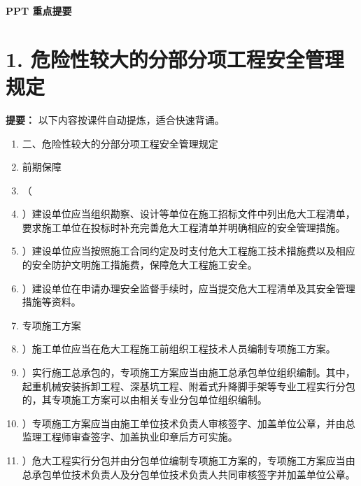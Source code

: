 \documentclass[UTF8,fontset=fandol,11pt]{ctexart}
\newcommand{\chaptertitle}[1]{\vspace{0.5em}\begin{tcolorbox}[enhanced,colback=deepblue,colframe=deepblue,arc=2mm,boxrule=0pt]\begin{center}\Large\bfseries\color{white}#1\end{center}\end{tcolorbox}\vspace{0.5em}}
\begin{document}
\tableofcontents

\newpage

\chaptertitle{PPT 重点提要}

\section*{1. 危险性较大的分部分项工程安全管理规定}


\begin{mainbox}

\textbf{提要：} 以下内容按课件自动提炼，适合快速背诵。

\end{mainbox}

\begin{enumerate}[label=\arabic*.]

\item 二、危险性较大的分部分项工程安全管理规定

\item 前期保障

\item （

\item ）建设单位应当组织勘察、设计等单位在施工招标文件中列出危大工程清单，要求施工单位在投标时补充完善危大工程清单并明确相应的安全管理措施。

\item ）建设单位应当按照施工合同约定及时支付危大工程施工技术措施费以及相应的安全防护文明施工措施费，保障危大工程施工安全。

\item ）建设单位在申请办理安全监督手续时，应当提交危大工程清单及其安全管理措施等资料。

\item 专项施工方案

\item ）施工单位应当在危大工程施工前组织工程技术人员编制专项施工方案。

\item ）实行施工总承包的，专项施工方案应当由施工总承包单位组织编制。其中，起重机械安装拆卸工程、深基坑工程、附着式升降脚手架等专业工程实行分包的，其专项施工方案可以由相关专业分包单位组织编制。

\item ）专项施工方案应当由施工单位技术负责人审核签字、加盖单位公章，并由总监理工程师审查签字、加盖执业印章后方可实施。

\item ）危大工程实行分包并由分包单位编制专项施工方案的，专项施工方案应当由总承包单位技术负责人及分包单位技术负责人共同审核签字并加盖单位公章。


\end{enumerate}
\end{document}

